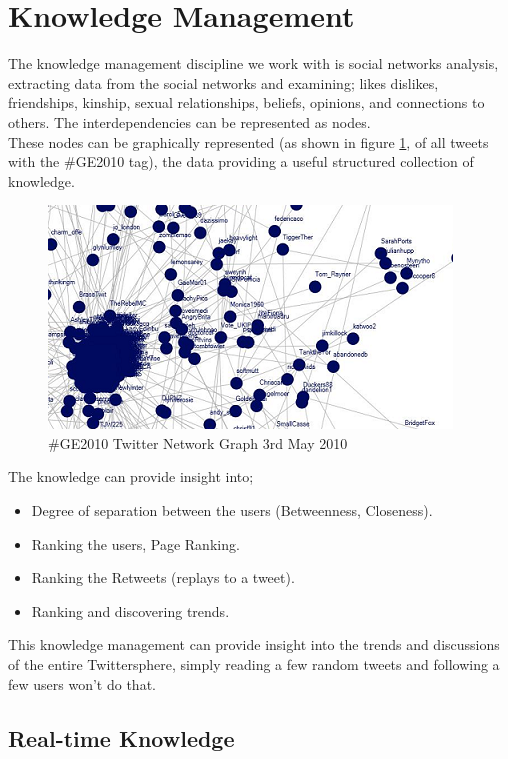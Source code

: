\documentclass[]{article}  %
\begin{document}
\section{Knowledge Management}
The knowledge management discipline we work with is social networks analysis, extracting data from the social networks and examining; likes dislikes, friendships, kinship, sexual relationships, beliefs, opinions, and connections to others. The interdependencies can be represented as nodes. \\ These nodes can be graphically represented (as shown in figure \ref{figGraph}, of all tweets with the \#GE2010 tag), the data providing a useful structured collection of knowledge. \\ 

\begin{figure}[h]
\centering
\includegraphics[scale=1]{twitter2010.png}
\caption{\#GE2010 Twitter Network Graph 3rd May 2010}
\label{figGraph}
\end{figure}

The knowledge can provide insight into;

\begin{itemize}
	\item Degree of separation between the users (Betweenness, Closeness).
	\item Ranking the users, Page Ranking.
	\item Ranking the Retweets (replays to a tweet).
	\item Ranking and discovering trends.
\end{itemize}

This knowledge management can provide insight into the trends and discussions of the entire Twittersphere, simply reading a few random tweets and following a few users won't do that.

\subsection{Real-time Knowledge}
\end{document}
